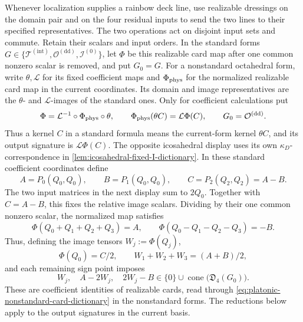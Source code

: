 \documentclass[11pt,letterpaper,onecolumn]{article}
\theoremstyle{plain}
\theoremstyle{definition}
\theoremstyle{remark}
\newcommand{\TetInt}{{\mathcal T^{(\mathrm{int})}}}
\newcommand{\OctDD}{{\mathcal O^{(\mathrm{dd})}}}
\newcommand{\IcoZero}{{\mathcal I^{(0)}}}
\begin{document}
Whenever localization supplies a rainbow deck line, use realizable dressings
on the domain pair and on the four residual inputs to send the two lines to
their specified representatives.  The two operations act on disjoint input
sets and commute. Retain their scalars and input orders.
In the standard forms \(G\in\{\TetInt,\OctDD,\IcoZero\}\),
let \(\Phi\) be this realizable card map after one common nonzero scalar is
removed, and put \(G_0=G\).
For a nonstandard octahedral form, write \(\theta,\mathcal L\) for its
fixed coefficient maps and \(\Phi_{\rm phys}\) for the normalized
realizable card map in the current coordinates.  Its domain and image representatives are the \(\theta\)- and
\(\mathcal L\)-images of the standard ones.  Only for coefficient
calculations put
\begin{equation}
 \Phi=\mathcal L^{-1}\circ\Phi_{\rm phys}\circ\theta,
 \qquad
 \Phi_{\rm phys}(\theta C)=\mathcal L\Phi(C),
 \qquad G_0=\OctDD.
 \label{eq:platonic-nonstandard-card-dictionary}
\end{equation}
Thus a kernel \(C\) in a standard formula means the current-form
kernel \(\theta C\), and its output signature is \(\mathcal L\Phi(C)\).
The opposite icosahedral display uses
its own \(\kappa_D\)-correspondence in
\cref{lem:icosahedral-fixed-I-dictionary}.
In these standard coefficient coordinates define
\begin{equation}
 A=P_0(Q_0,Q_0),\qquad
 B=P_1(Q_0,Q_0),\qquad
 C=P_2(Q_2,Q_2)=A-B.
 \label{eq:platonic-rainbow-normalization}
\end{equation}
The two input matrices in the next display sum to \(2Q_0\).  Together with
\(C=A-B\), this fixes the relative image scalars.  Dividing by their one common nonzero scalar, the normalized map satisfies
\begin{equation}
 \Phi(Q_0+Q_1+Q_2+Q_3)=A,
 \qquad
 \Phi(Q_0-Q_1-Q_2-Q_3)=-B.
 \label{eq:platonic-rainbow-images}
\end{equation}
Thus, defining the image tensors \(W_j:=\Phi(Q_j)\),
\begin{equation}
 \Phi(Q_0)=C/2,
 \qquad
 W_1+W_2+W_3=(A+B)/2,
 \label{eq:platonic-rainbow-sum}
\end{equation}
and each remaining sign point imposes
\begin{equation}
 W_j,\quad A-2W_j,\quad 2W_j-B
 \in\{0\}\cup\operatorname{cone}\bigl(\mathfrak D_4(G_0)\bigr).
 \label{eq:platonic-separated-sign-tests}
\end{equation}
These are coefficient identities of realizable cards, read through
\cref{eq:platonic-nonstandard-card-dictionary} in the nonstandard forms.
The reductions below apply to the output signatures in the current basis.
\end{document}
